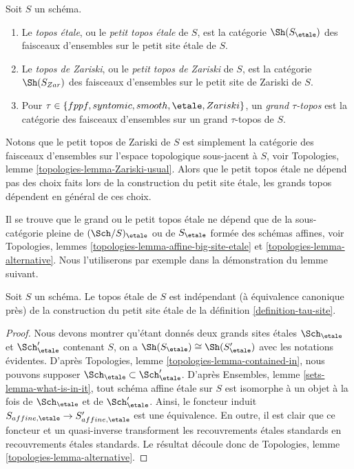 \begin{definition}
\label{definition-etale-topos}
Soit $S$ un sch\'ema.
\begin{enumerate}
\item Le {\it topos \'etale}, ou le {\it petit topos \'etale}
de $S$, est la cat\'egorie $\Sh(S_\etale)$ des faisceaux d'ensembles sur
le petit site \'etale de $S$.
\item Le {\it topos de Zariski}, ou le {\it petit topos de Zariski}
de $S$, est la cat\'egorie $\Sh(S_{Zar})$ des faisceaux d'ensembles sur le
petit site de Zariski de $S$.
\item Pour $\tau \in \{fppf, syntomic, smooth, \etale, Zariski\}$, un
{\it grand $\tau$-topos} est la cat\'egorie des faisceaux d'ensembles sur un
grand $\tau$-topos de $S$.
\end{enumerate}
\end{definition}

\noindent
Notons que le petit topos de Zariski de $S$ est simplement la cat\'egorie des faisceaux
d'ensembles sur l'espace topologique sous-jacent \`a $S$, voir
Topologies, lemme \ref{topologies-lemma-Zariski-usual}.
Alors que le petit topos \'etale ne d\'epend pas des choix faits lors de la
construction du petit site \'etale, les grands topos d\'ependent en g\'en\'eral
de ces choix.

\medskip\noindent
Il se trouve que le grand ou le petit topos \'etale ne d\'epend que de la
sous-cat\'egorie pleine de $(\Sch/S)_\etale$ ou de $S_\etale$ form\'ee des
sch\'emas affines, voir
Topologies, lemmes \ref{topologies-lemma-affine-big-site-etale} et
\ref{topologies-lemma-alternative}.
Nous l'utiliserons par exemple dans la d\'emonstration du lemme suivant.

\begin{lemma}
\label{lemma-etale-topos-independent-partial-universe}
Soit $S$ un sch\'ema. Le topos \'etale de $S$ est ind\'ependant
(\`a \'equivalence canonique pr\`es) de la construction du petit
site \'etale de la d\'efinition \ref{definition-tau-site}.
\end{lemma}

\begin{proof}
Nous devons montrer qu'\'etant donn\'es deux grands sites \'etales
$\Sch_\etale$ et $\Sch_\etale'$ contenant
$S$, on a $\Sh(S_\etale) \cong \Sh(S_\etale')$
avec les notations \'evidentes. D'apr\`es Topologies, lemme \ref{topologies-lemma-contained-in},
nous pouvons supposer $\Sch_\etale \subset \Sch_\etale'$.
D'apr\`es Ensembles, lemme \ref{sets-lemma-what-is-in-it},
tout sch\'ema affine \'etale sur $S$ est isomorphe \`a un objet
\`a la fois de $\Sch_\etale$ et de $\Sch_\etale'$.
Ainsi, le foncteur induit
$S_{affine, \etale} \to S_{affine, \etale}'$
est une \'equivalence. En outre, il est clair que ce foncteur
et un quasi-inverse transforment les recouvrements \'etales standards en
recouvrements \'etales standards.
Le r\'esultat d\'ecoule donc de
Topologies, lemme \ref{topologies-lemma-alternative}.
\end{proof}





